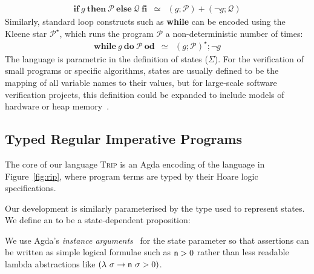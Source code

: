 \documentclass[sigplan,review]{acmart}\settopmatter{printfolios=true,printccs=false,printacmref=false}
\begin{document}
$$
\begin{array}{lcl}
\textbf{if}\ g\ \textbf{then}\ \mathcal{P}\ \textbf{else}\ \mathcal{Q}\ \textbf{fi} & \simeq & (g;\mathcal{P}) + (\neg g; \mathcal{Q}) 
\end{array}
$$
Similarly, standard loop constructs such as \textbf{while} can be encoded using the Kleene star $\mathcal{P}^\star$, which runs the program $\mathcal{P}$ a non-deterministic
number of times:
$$
\begin{array}{lcl}
\textbf{while}\ g\ \textbf{do}\ \mathcal{P}\ \textbf{od} & \simeq & (g; \mathcal{P})^\star; \neg g
\end{array}
$$
The language is parametric in the definition of states ($\Sigma$). For the verification of small programs or
specific algorithms, states are usually defined to be the mapping of all variable names to their values, but 
for large-scale software verification projects, this definition could be expanded to include models of hardware 
or heap memory~\citep{cmem}.

\subsection{Typed Regular Imperative Programs}\label{subsec:trip}

The core of our language \textsc{Trip} is an Agda encoding of the language in Figure~\ref{fig:rip}, where
program terms are typed by their Hoare logic specifications.

Our development is similarly parameterised by the type used to represent states. We define an
 to be a state-dependent proposition:
\begin{code}
\>[2]\AgdaSpace{}%
\AgdaSymbol{=}\AgdaSpace{}%
\AgdaSpace{}%
\AgdaSpace{}%
\AgdaSymbol{:}\AgdaSpace{}%
\AgdaSpace{}%
\AgdaSpace{}%
\AgdaSpace{}%
\<%
\end{code}
We use Agda's \emph{instance arguments}~\citep{instanceargs} for the state parameter
so that assertions can be written as simple logical formulae such as $\AgdaField{n} > 0$ rather than 
less readable lambda abstractions like $(\lambda\ \sigma \rightarrow \AgdaField{n}\ \sigma > 0)$.
\end{document}

